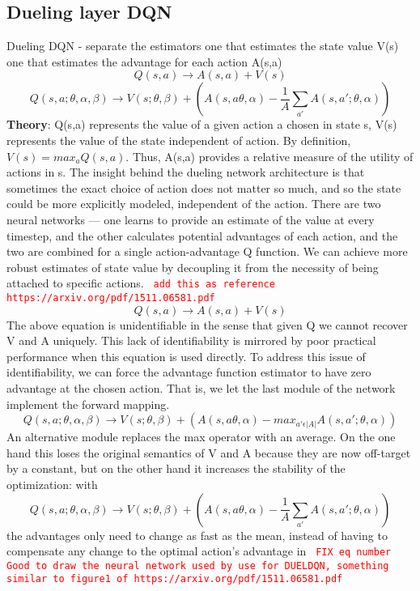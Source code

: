 \subsection{Dueling layer DQN}
Dueling DQN - separate the estimators
one that estimates the state value V(s)
one that estimates the advantage for each action A(s,a)
\begin{equation}
Q(s,a) \rightarrow A(s,a) + V(s)
\end{equation}
\begin{equation}
Q(s,a; \theta, \alpha, \beta) \rightarrow V(s; \theta, \beta) + (A(s,a\theta, \alpha) - \frac{1}{A} \sum_{a'}^{} A(s,a';\theta,\alpha ))
\end{equation}
\textbf{Theory}:
Q(s,a) represents the value of a given action a chosen in state s, V(s) represents the value of the state independent of action. By definition, $V(s)=max_{a}Q(s,a)$. Thus, A(s,a) provides a relative measure of the utility of actions in s. The insight behind the dueling network architecture is that sometimes the exact choice of action does not matter so much, and so the state could be more explicitly modeled, independent of the action. There are two neural networks — one learns to provide an estimate of the value at every timestep, and the other calculates potential advantages of each action, and the two are combined for a single action-advantage Q function. We can achieve more robust estimates of state value by decoupling it from the necessity of being attached to specific actions.
 \textcolor{red}{\texttt{ add this as reference https://arxiv.org/pdf/1511.06581.pdf }}
\newline
\begin{equation}
Q(s,a) \rightarrow A(s,a) + V(s)
\end{equation}
The above equation is unidentifiable in the sense that given Q
we cannot recover V and A uniquely. This lack of identifiability is mirrored by
poor practical performance when this equation is used directly. To address this issue of identifiability, we can force the advantage
function estimator to have zero advantage at the
chosen action. That is, we let the last module of the network
implement the forward mapping.
\begin{equation}
Q(s,a; \theta, \alpha, \beta) \rightarrow V(s; \theta, \beta) + (A(s,a\theta, \alpha) - max_{a' \epsilon |A|} A(s,a';\theta,\alpha ))
\end{equation}
An alternative module replaces the max operator with an
average. On the one hand this loses the original semantics of V and
A because they are now off-target by a constant, but on
the other hand it increases the stability of the optimization:
with 
\begin{equation}
Q(s,a; \theta, \alpha, \beta) \rightarrow V(s; \theta, \beta) + (A(s,a\theta, \alpha) - \frac{1}{A} \sum_{a'}^{} A(s,a';\theta,\alpha ))
\end{equation}
 the advantages only need to change as fast as the
mean, instead of having to compensate any change to the
optimal action’s advantage in  \textcolor{red}{\texttt{ FIX eq number }}
\newline
 \textcolor{red}{\texttt{ Good to draw the neural network used by use for DUELDQN, something similar to figure1 of https://arxiv.org/pdf/1511.06581.pdf }}
